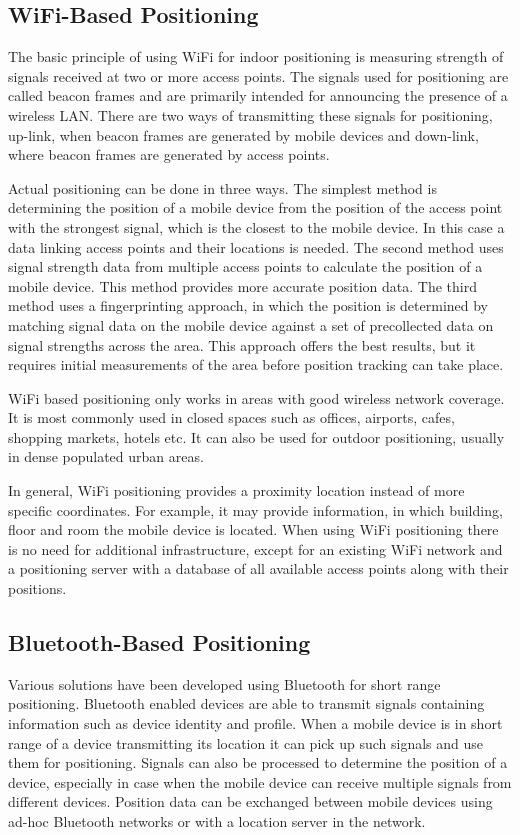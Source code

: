 \subsection{WiFi-Based Positioning}
The basic principle of using WiFi for indoor positioning is measuring strength of signals received at two or more access points. The signals used for positioning are called beacon frames and are primarily intended for announcing the presence of a wireless LAN. There are two ways of transmitting these signals for positioning, up-link, when beacon frames are generated by mobile devices and down-link, where beacon frames are generated by access points.

Actual positioning can be done in three ways. The simplest method is determining the position of a mobile device from the position of the access point with the strongest signal, which is the closest to the mobile device. In this case a data linking access points and their locations is needed. The second method uses signal strength data from multiple access points to calculate the position of a mobile device. This method provides more accurate position data. The third method uses a fingerprinting approach, in which the position is determined by matching signal data on the mobile device against a set of precollected data on signal strengths across the area. This approach offers the best results, but it requires initial measurements of the area before position tracking can take place.

WiFi based positioning only works in areas with good wireless network coverage. It is most commonly used in closed spaces such as offices, airports, cafes, shopping markets, hotels etc. It can also be used for outdoor positioning, usually in dense populated urban areas.

In general, WiFi positioning provides a proximity location instead of more specific coordinates. For example, it may provide information, in which building, floor and room the mobile device is located. When using WiFi positioning there is no need for additional infrastructure, except for an existing WiFi network and a positioning server with a database of all available access points along with their positions.

\subsection{Bluetooth-Based Positioning}
Various solutions have been developed using Bluetooth for short range positioning. Bluetooth enabled devices are able to transmit signals containing information such as device identity and profile. When a mobile device is in short range of a device transmitting its location it can pick up such signals and use them for positioning. Signals can also be processed to determine the position of a device, especially in case when the mobile device can receive multiple signals from different devices. Position data can be exchanged between mobile devices using ad-hoc Bluetooth networks or with a location server in the network.

